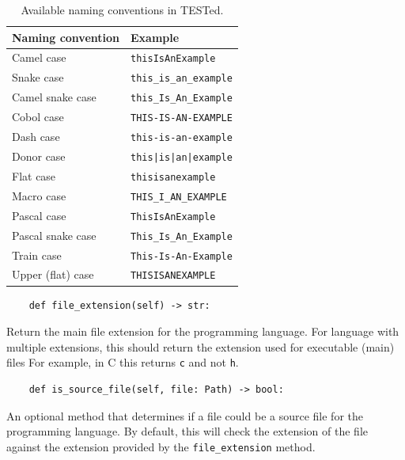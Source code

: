 \documentclass[../main]{subfiles}
\begin{document}
\begin{table}[h]
    \centering
    \caption{Available naming conventions in TESTed.}
    \label{tab:naming-conventions}
    \begin{tabular}{|l|l|}
        \hline
        Naming convention & Example \\
        \hline
        Camel case & \texttt{thisIsAnExample}  \\
        Snake case & \texttt{this\_is\_an\_example} \\
        Camel snake case & \texttt{this\_Is\_An\_Example} \\
        Cobol case & \texttt{THIS-IS-AN-EXAMPLE} \\
        Dash case & \texttt{this-is-an-example} \\
        Donor case & \texttt{this|is|an|example} \\
        Flat case & \texttt{thisisanexample} \\
        Macro case & \texttt{THIS\_I\_AN\_EXAMPLE} \\
        Pascal case & \texttt{ThisIsAnExample} \\
        Pascal snake case & \texttt{This\_Is\_An\_Example} \\
        Train case & \texttt{This-Is-An-Example} \\
        Upper (flat) case & \texttt{THISISANEXAMPLE} \\
        \hline
    \end{tabular}
\end{table}

\begin{verbatim}
    def file_extension(self) -> str:
\end{verbatim}

Return the main file extension for the programming language.
For language with multiple extensions, this should return the extension used for executable (main) files
For example, in C this returns \texttt{c} and not \texttt{h}.

\begin{verbatim}
    def is_source_file(self, file: Path) -> bool:
\end{verbatim}

An optional method that determines if a file could be a source file for the programming language.
By default, this will check the extension of the file against the extension provided by the \texttt{file_extension} method.
\end{document}

